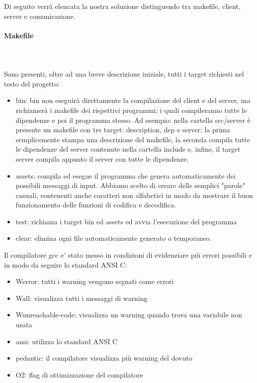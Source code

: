 \documentclass[12pt]{article}
\begin{document}
Di seguito verrà elencata la nostra soluzione distinguendo tra makefile, client, server e comunicazione.
\paragraph{Makefile} \mbox{}\\ \\
Sono presenti, oltre ad una breve descrizione iniziale, tutti i target richiesti nel testo del progetto: 
    	\begin{itemize}
   		\item bin: bin non eseguirà direttamente la compilazione del client e del server, ma richiamerà i makefile dei rispettivi programmi; i quali compileranno tutte le dipendenze e poi il programma stesso. Ad esempio: nella cartella src/server è presente un makefile con tre target: description, dep e server: la prima semplicemente stampa una descrizione del makefile, la seconda compila tutte le dipendenze del server contenute nella cartella include e, infine, il target server compila appunto il server con tutte le dipendenze. 
    		\item assets: compila ed esegue il programma che genera automaticamente dei possibili messaggi di input. Abbiamo scelto di creare delle semplici "parole" casuali, contenenti anche caratteri non alfabetici in modo da mostrare il buon funzionamento delle funzioni di codifica e decodifica.
    		\item test: richiama i target bin ed assets ed avvia l'esecuzione del programma
    		\item clear: elimina ogni file automaticamente generato o temporaneo.
    	\end{itemize}
Il compilatore gcc e' stato messo in condizioni di evidenziare più errori possibili e in modo da seguire lo standard ANSI C:
    \begin{itemize}
        \item Werror: tutti i warning vengono segnati come errori    
        \item Wall: visualizza tutti i messaggi di warning
        \item Wunreachable-code: visualizza un warning quando trova una variabile non usata
        \item ansi: utilizza lo standard ANSI C
        \item pedantic: il compilatore visualizza più warning del dovuto
        \item O2: flag di ottimizzazione del compilatore
    \end{itemize}
\end{document}
